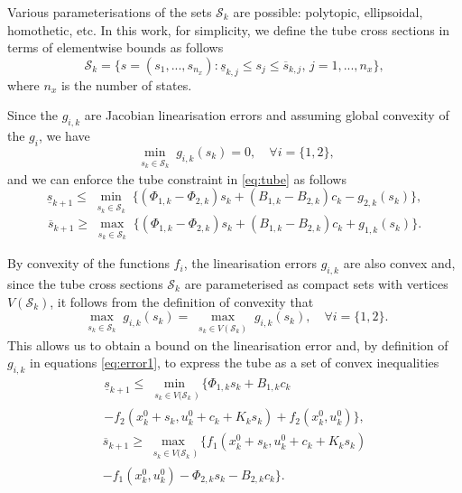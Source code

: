 \documentclass[letterpaper, 10 pt, conference]{ieeeconf}
\begin{document}
Various parameterisations of the sets $\mathcal{S}_k$ are possible: polytopic,  ellipsoidal, homothetic, etc. In this work, for simplicity, we define the tube cross sections in terms of elementwise bounds as follows
%
\[
\mathcal{S}_k = \{ s = (s_{1}, ..., s_{n_x}): \underline{s}_{k, j} \leq s_{j} \leq \overline{s}_{k, j}, \, j = 1, ..., n_x \},
\]
where $n_x$ is the number of states.

Since the $g_{i, k}$ are Jacobian linearisation errors and assuming global convexity of the $g_i$, we have
%
\[
\min_{\substack{s_k \in \mathcal{S}_k}} g_{i, k}(s_k) = 0, \quad \forall i = \{1, 2\}, 
\]
%
and we can enforce the tube constraint in \eqref{eq:tube} as follows
%
\begin{equation*}
\underline{s}_{k+1} \leq \min_{\substack{s_{k} \in \mathcal{S}_k}} \{(\Phi_{1, k}-\Phi_{2, k}) s_{k} + (B_{1, k}-B_{2, k}) c_k - g_{2,k}(s_{k})\}, 
\end{equation*}
%
\begin{equation*}
\overline{s}_{k+1} \geq \max_{\substack{s_{k} \in \mathcal{S}_k}} \{(\Phi_{1, k}-\Phi_{2, k}) s_{k} + (B_{1, k}-B_{2, k}) c_k + g_{1, k}(s_{k}) \}. 
\end{equation*}

By convexity of the functions $f_i$, the linearisation errors $g_{i, k}$ are also convex and, since the tube cross sections $\mathcal{S}_k$ are parameterised as compact sets with vertices $V(\mathcal{S}_k)$, it follows from the definition of convexity that 
%
\[
\max_{\substack{s_k \in \mathcal{S}_k}} g_{i, k}(s_k) = \max_{\substack{s_k \in V(\mathcal{S}_k)}} g_{i, k}(s_k), \quad \forall i = \{1, 2\}. %
\]
%
This allows us to obtain a bound on the linearisation error and, by definition of $g_{i, k}$ in equations \eqref{eq:error1},  to  express the tube as a set of convex inequalities
%
\begin{multline}
\label{eq:tube1}
\underline{s}_{k+1} \leq \min_{\substack{s_{k} \in V(\mathcal{S}_k})} \{\Phi_{1, k} s_{k} + B_{1, k} c_k  \\ - f_2(x^0_k + s_{k}, u^0_k + c_k + K_k s_{k}) + f_2(x^0_k, u^0_k) \}, 
\end{multline}
%
\begin{multline}
\label{eq:tube2}
\overline{s}_{k+1} \geq \max_{\substack{s_{k} \in V(\mathcal{S}_k})} \{f_1(x^0_k + s_{k}, u^0_k + c_k + K_k s_{k})\\ -f_1(x^0_k, u^0_k) - \Phi_{2, k} s_{k} - B_{2, k} c_k  \}.
\end{multline}
\end{document}
